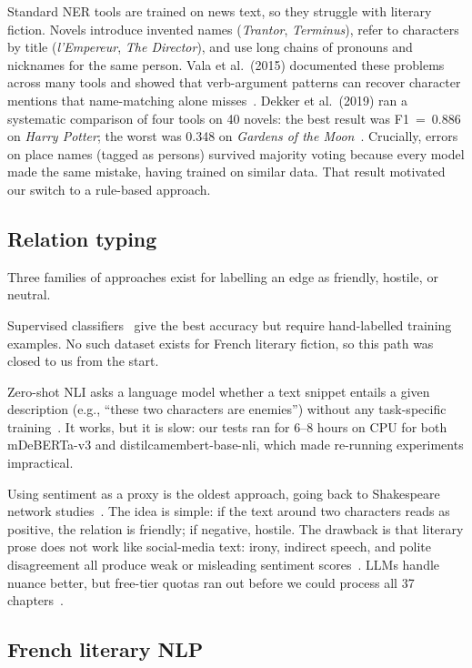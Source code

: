 \documentclass[a4paper]{article}
\begin{document}
Standard NER tools are trained on news text, so they struggle with
literary fiction. Novels introduce invented names (\textit{Trantor},
\textit{Terminus}), refer to characters by title (\textit{l'Empereur},
\textit{The Director}), and use long chains of pronouns and nicknames
for the same person. Vala et al.\ (2015) documented these problems across
many tools and showed that verb-argument patterns can recover character
mentions that name-matching alone misses~\cite{Vala2015}. Dekker et al.\
(2019) ran a systematic comparison of four tools on 40 novels: the best
result was F1~=~0.886 on \textit{Harry Potter}; the worst was 0.348 on
\textit{Gardens of the Moon}~\cite{Dekker2019}. Crucially, errors on
place names (tagged as persons) survived majority voting because every
model made the same mistake, having trained on similar data.
That result motivated our switch to a rule-based approach.

\subsection{Relation typing}

Three families of approaches exist for labelling an edge as
friendly, hostile, or neutral.

Supervised classifiers~\cite{Devlin2019} give the best accuracy but
require hand-labelled training examples. No such dataset exists for
French literary fiction, so this path was closed to us from the start.

Zero-shot NLI asks a language model whether a text snippet entails a
given description (e.g., ``these two characters are enemies'') without
any task-specific training~\cite{Yin2019,Laurer2022}. It works, but
it is slow: our tests ran for 6--8 hours on CPU for both mDeBERTa-v3
and distilcamembert-base-nli, which made re-running experiments impractical.

Using sentiment as a proxy is the oldest approach, going back to
Shakespeare network studies~\cite{Nalisnick2013}. The idea is simple:
if the text around two characters reads as positive, the relation is
friendly; if negative, hostile. The drawback is that literary prose does
not work like social-media text: irony, indirect speech, and polite
disagreement all produce weak or misleading sentiment scores~\cite{Labatut2019}.
LLMs handle nuance better, but free-tier quotas ran out before we could
process all 37 chapters~\cite{Wei2023}.

\subsection{French literary NLP}
\end{document}
